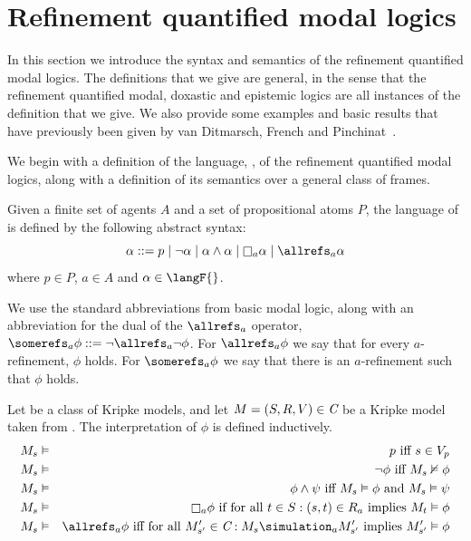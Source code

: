 \section{Refinement quantified modal logics}

In this section we introduce the syntax and semantics of the refinement
quantified modal logics. The definitions that we give are general, in the sense
that the refinement quantified modal, doxastic and epistemic logics are all
instances of the definition that we give. We also provide some examples and
basic results that have previously been given by van Ditmarsch, French and
Pinchinat~\cite{french2010future}.

We begin with a definition of the language, \langF{}, of the refinement
quantified modal logics, along with a definition of its semantics over a general
class of frames.

\begin{definition}
Given a finite set of agents $A$ and a set of propositional atoms $P$, the
language of \langF{} is defined by the following abstract syntax:
$$
\alpha ::=  p \bnfalt
            \neg \alpha \bnfalt
            \alpha \land \alpha \bnfalt
            \knows_a \alpha \bnfalt
            \allrefs_a \alpha
$$
where $p \in P$, $a \in A$ and $\alpha \in \langF{}$.
\end{definition}

We use the standard abbreviations from basic modal logic, along with an
abbreviation for the dual of the $\allrefs_a$ operator, $\somerefs_a \phi ::=
\neg \allrefs_a \neg \phi$. For $\allrefs_a \phi$ we say that for every
$a$-refinement, $\phi$ holds. For $\somerefs_a \phi$ we say that there is an
$a$-refinement such that $\phi$ holds.

\begin{definition}
Let \classC{} be a class of Kripke models, and let $M = (S, R, V) \in \textit{C}$
be a Kripke model taken from \classC{}. The interpretation of $\phi$ is defined
inductively.
\begin{eqnarray*}
M_s &\entails& p \text{ iff } s \in V_p\\
M_s &\entails& \neg \phi \text{ iff } M_s \nentails \phi\\
M_s &\entails& \phi \land \psi \text{ iff } M_s \entails \phi \text{ and } M_s
\entails \psi\\
M_s &\entails& \knows_a \phi \text{ if for all } t \in S : (s, t) \in R_a \text{
implies } M_t \entails \phi\\
M_s &\entails& \allrefs_a \phi \text{ iff for all } M'_{s'} \in \classC : M_s
\simulation_a M'_{s'} \text{ implies } M'_{s'} \entails \phi
\end{eqnarray*}
\end{definition}

